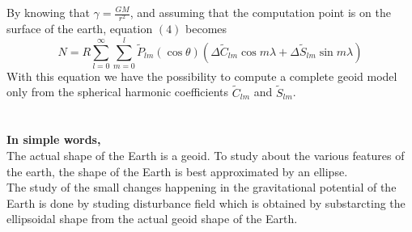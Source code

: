 \documentclass[a4paper,12pt]{article}
\begin{document}
By knowing that $\gamma=\frac{GM}{r^2}$, and assuming that the computation point is on the surface of the earth, equation $(4)$ becomes
\begin{equation}
N=R\sum_{l=0}^{\infty}\sum_{m=0}^{l} \widetilde{P}_{lm}(\cos\theta)(\Delta\widetilde{C}_{lm}\cos m\lambda + \Delta\widetilde{S}_{lm}\sin m\lambda)
\end{equation}
With this equation we have the possibility to compute a complete geoid model only from
the spherical harmonic coefficients $\widetilde{C}_{lm}$ and $\widetilde{S}_{lm}$.\\\\\\

\textbf{In simple words,}
\\The actual shape of the Earth is a geoid. To study about the various features of the earth, the shape of the Earth is best approximated by an ellipse.
\\The study of the small changes happening in the gravitational potential of the Earth is done by studing disturbance field which is obtained by substarcting the ellipsoidal shape from the actual geoid shape of the Earth.\\\\
\end{document}
